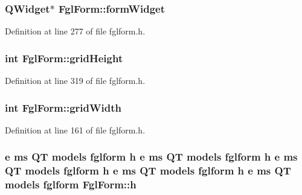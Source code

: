 \hypertarget{classFglForm_a382565fe4e148f5e37aabea41e079809}{
\subsubsection[{formWidget}]{\setlength{\rightskip}{0pt plus 5cm}QWidget$\ast$ {\bf FglForm::formWidget}}}
\label{classFglForm_a382565fe4e148f5e37aabea41e079809}


Definition at line 277 of file fglform.h.

\hypertarget{classFglForm_a9dc5de78bd4b0d7024831926f9cdc7d9}{
\subsubsection[{gridHeight}]{\setlength{\rightskip}{0pt plus 5cm}int {\bf FglForm::gridHeight}}}
\label{classFglForm_a9dc5de78bd4b0d7024831926f9cdc7d9}


Definition at line 319 of file fglform.h.

\hypertarget{classFglForm_a34347fff01950e4574b64c69b62d1ff2}{
\subsubsection[{gridWidth}]{\setlength{\rightskip}{0pt plus 5cm}int {\bf FglForm::gridWidth}}}
\label{classFglForm_a34347fff01950e4574b64c69b62d1ff2}


Definition at line 161 of file fglform.h.

\hypertarget{classFglForm_a2adf651bccc4bd01a985a0c5bde45af7}{
\subsubsection[{h}]{\setlength{\rightskip}{0pt plus 5cm}e ms QT models fglform {\bf h} e ms QT models fglform {\bf h} e ms QT models fglform {\bf h} e ms QT models fglform {\bf h} e ms QT models fglform {\bf FglForm::h}}}
\label{classFglForm_a2adf651bccc4bd01a985a0c5bde45af7}


